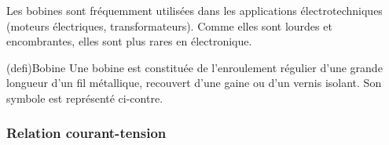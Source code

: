 \documentclass[../../main/main.tex]{subfiles}
\begin{document}
Les bobines sont fréquemment utilisées dans les applications électrotechniques
(moteurs électriques, transformateurs). Comme elles sont lourdes et
encombrantes, elles sont plus rares en électronique.

\begin{tcb*}[label=def:bobine, sidebyside, righthand ratio=.3](defi){Bobine}
	Une bobine est constituée de l'enroulement régulier d'une grande
	longueur d'un fil métallique, recouvert d'une gaine ou d'un vernis
	isolant. Son symbole est représenté ci-contre.
	\tcblower
	\begin{center}
	\end{center}
\end{tcb*}

\subsubsection{Relation courant-tension}
\end{document}
